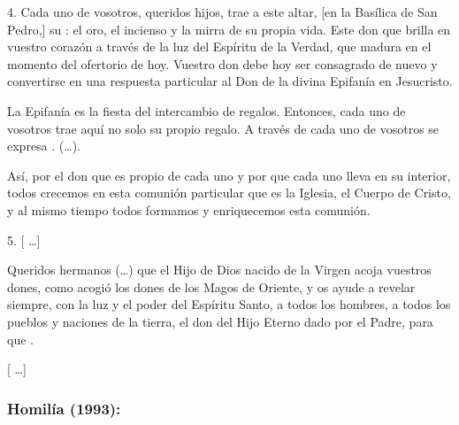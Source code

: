 \begin{body}
					4. Cada uno de vosotros, queridos hijos, trae a este altar, {[}en la Basílica de San Pedro,{]} su : el oro, el incienso y la mirra de su propia vida. Este don que brilla en vuestro corazón a través de la luz del Espíritu de la Verdad, que madura en el momento del ofertorio de hoy. Vuestro don debe hoy ser consagrado de nuevo y convertirse en una respuesta particular al Don de la divina Epifanía en Jesucristo.
					
					La Epifanía es la fiesta del intercambio de regalos. Entonces, cada uno de vosotros trae aquí no solo su propio regalo. A través de cada uno de vosotros se expresa . (\ldots{}).
					
					Así, por el don que es propio de cada uno y por  que cada uno lleva en su interior, todos crecemos en esta comunión particular que es la Iglesia, el Cuerpo de Cristo, y al mismo tiempo todos formamos y enriquecemos esta comunión.
					
					5. {[} \ldots{}{]}
					
					Queridos hermanos (\ldots{}) que el Hijo de Dios nacido de la Virgen acoja vuestros dones, como acogió los dones de los Magos de Oriente, y os ayude a revelar siempre, con la luz y el poder del Espíritu Santo, a todos los hombres, a todos los pueblos y naciones de la tierra, el don del Hijo Eterno dado por el Padre, para que .
					
					{[} \ldots{}{]}
				\end{body}
			
			\subsubsection{Homilía (1993):} 
			
				
